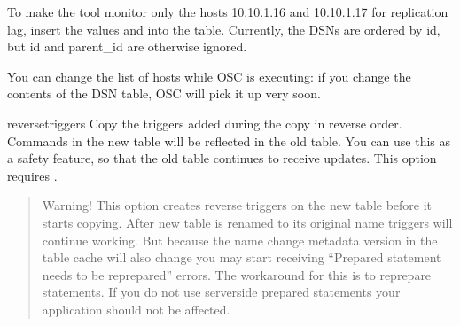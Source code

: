 \documentclass[letterpaper,10pt,english]{sphinxmanual}
\begin{document}
\begin{fulllineitems}
\sphinxAtStartPar
To make the tool monitor only the hosts 10.10.1.16 and 10.10.1.17 for
replication lag, insert the values  and  into the
table. Currently, the DSNs are ordered by id, but id and parent\_id are otherwise
ignored.

\sphinxAtStartPar
You can change the list of hosts while OSC is executing:
if you change the contents of the DSN table, OSC will pick it up very soon.

\end{fulllineitems}


\sphinxAtStartPar
\textendash{}reverse\sphinxhyphen{}triggers Copy the triggers added during the copy in reverse order. Commands in the new table will be
reflected in the old table. You can use this as a safety feature, so that the old
table continues to receive updates. This option requires .
\begin{quote}

\sphinxAtStartPar
Warning! This option creates reverse triggers on the new table before it starts copying.
After new table is renamed to its original name triggers will continue working. But because the
name change metadata version in the table cache will also change you may start receiving
“Prepared statement needs to be re\sphinxhyphen{}prepared” errors. The workaround for this is to re\sphinxhyphen{}prepare statements.
If you do not use server\sphinxhyphen{}side prepared statements your application should not be affected.
\end{quote}
\end{document}
